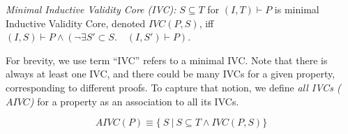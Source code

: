 \begin{definition}{\emph{Minimal Inductive Validity Core (IVC):}}
  \label{def:minimal-ivc}
  $S \subseteq T$ for $(I, T)\vdash P$ is minimal Inductive Validity Core, denoted $IVC(P, S)$, iff
  $(I, S) \vdash P \wedge (\neg\exists S' \subset S .\quad (I, S') \vdash P) $.
\end{definition}

For brevity, we use term ``IVC'' refers to a minimal IVC. Note that there is always at least one IVC, and there could be many IVCs for a given property, corresponding to different proofs. To capture that notion, we define \emph{all IVCs ($AIVC$)} for a property as an association to all its IVCs.

$$ AIVC(P) \equiv  \{\ S~|~S \subseteq T \land  IVC(P, S)\} $$

 
%
 
 
